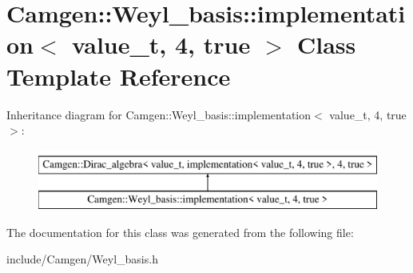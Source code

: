 \hypertarget{a00301}{\section{Camgen\-:\-:Weyl\-\_\-basis\-:\-:implementation$<$ value\-\_\-t, 4, true $>$ Class Template Reference}
\label{a00301}
}
Inheritance diagram for Camgen\-:\-:Weyl\-\_\-basis\-:\-:implementation$<$ value\-\_\-t, 4, true $>$\-:\begin{figure}[H]
\begin{center}
\leavevmode
\includegraphics[height=2.000000cm]{a00301}
\end{center}
\end{figure}


The documentation for this class was generated from the following file\-:\begin{DoxyCompactItemize}
\item 
include/\-Camgen/Weyl\-\_\-basis.\-h\end{DoxyCompactItemize}
